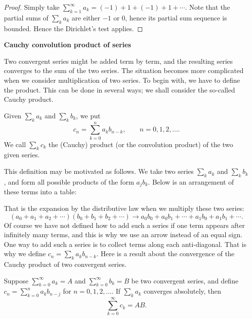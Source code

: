 \documentclass[11pt]{article}
\begin{document}
\begin{proof}
  Simply take $\sum_{k=1}^\infty a_k = (-1) + 1 + (-1) + 1 + \cdots$.
  Note that the partial sums of $\sum_k a_k$ are either $-1$ or $0$, hence its partial sum sequence is bounded.
  Hence the Dirichlet's test applies.
\end{proof}

\noindent\textbf{\large Cauchy convolution product of series}

Two convergent series might be added term by term, and the resulting series converges to the sum of the two series.
The situation becomes more complicated when we consider multiplication of two series.
To begin with, we have to define the product.
This can be done in several ways; we shall consider the so-called Cauchy product.

\begin{defn}
  Given $\sum_k a_k$ and $\sum_k b_k$, we put
  \[
    c_n = \sum_{k=0}^n a_k b_{n-k}, \qquad n = 0, 1, 2, \dots.
  \]
  We call $\sum_k c_k$ the \textsf{(Cauchy) product} (or the \textsf{convolution product}) of the two given series.
\end{defn}

This definition may be motivated as follows.
We take two series $\sum_k a_k$ and $\sum_k b_k$, and form all possible products of the form $a_j b_k$. Below is an arrangement of these terms into a table:

\begin{center}
\end{center}
That is the expansion by the distributive law when we multiply these two series:
\[
  (a_0 + a_1 + a_2 + \cdots)(b_0 + b_1 + b_2 + \cdots) \rightarrow
  a_0 b_0 + a_0 b_1 + \cdots + a_1 b_0 + a_1 b_1 + \cdots.
\]
Of course we have not defined how to add such a series if one term appears after infinitely many terms, and this is why we use an arrow instead of an equal sign.
One way to add such a series is to collect terms along each anti-diagonal.
That is why we define $c_n = \sum_k a_k b_{n-k}$.
Here is a result about the convergence of the Cauchy product of two convergent series.

\begin{thm}[Mertens]
  Suppose $\sum_{k=0}^\infty a_k = A$ and $\sum_{k=0}^\infty b_k = B$ be two convergent series, and define $c_n = \sum_{k=0}^n a_k b_{n-j}$ for $n = 0, 1, 2, \dots$.
  If $\sum_k a_k$ converges absolutely, then
  \[
    \sum_{k=0}^\infty c_k = AB.
  \]
\end{thm}
\end{document}

